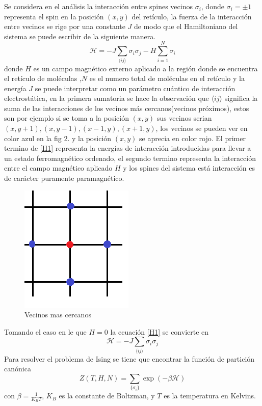 \documentclass[a4paper]{article}
\begin{document}
Se considera en el análisis la interacción entre spines vecinos $\sigma_{i}$, donde $\sigma_i=\pm1$ representa el spin en la  posición $(x,y)$ del retículo, la fuerza de la interacción entre vecinos se rige por una constante $J$ de modo que el Hamiltoniano del sistema se puede escribir de la siguiente manera.
\begin{equation}
\label{H1}
\mathcal{H}=-J\sum_{\langle i j\rangle}\sigma_i \sigma_j-H\sum_{i=1}^{N}\sigma_i
\end{equation}
donde $H$ es un campo magnético externo aplicado a la región donde se encuentra el retículo de moléculas ,$N$ es el numero total de moléculas en el retículo y la energía $J$ se puede interpretar como un parámetro cuántico de interacción electrostática, en la primera sumatoria se hace la observación que $\langle i j\rangle$ significa la suma de las interacciones de los vecinos más cercanos(vecinos próximos), estos son por ejemplo si se toma a la posición $(x,y)$ sus vecinos serian ${(x,y+1),(x,y-1),(x-1,y),(x+1,y)}$, los vecinos se pueden ver en color azul en la fig 2. y la posición $(x,y)$ se aprecia en color rojo. El primer termino de \ref{H1} representa la energías de interacción introducidas para llevar a un estado ferromagnético ordenado, el segundo termino representa la interacción entre el campo magnético aplicado $H$ y los spines del sistema está interacción es de carácter puramente paramagnético.
\begin{figure}[H]
\begin{center}
\includegraphics[scale=0.4]{Neighbor.png} 
\end{center} 
\caption{Vecinos mas cercanos}
\end{figure}
Tomando el caso en le que $H=0$ la ecuación \ref{H1} se convierte en 
\begin{equation}
\label{H2}
\mathcal{H}=-J\sum_{\langle i j\rangle}\sigma_i \sigma_j
\end{equation}
Para resolver el problema de Ising se tiene que encontrar la función de partición canónica
\begin{equation}\label{partition}
Z(T,H,N)=\sum_{\{ \sigma_i\}}\exp(-\beta \mathcal{H})
\end{equation}
con $\beta=\frac{1}{K_B T}$, $K_B$ es la constante de Boltzman, y $T$ es la temperatura en Kelvins.\\
\end{document}
